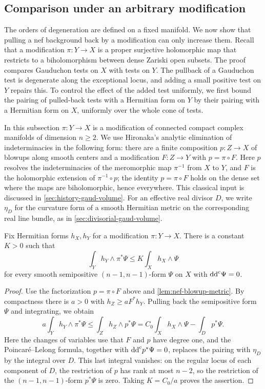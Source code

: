 \subsection{Comparison under an arbitrary modification}\label{sec:nef-modification-comparison}

The orders of degeneration are defined on a fixed manifold. We now show that pulling a nef background back by a modification can only increase them. Recall that a modification $\pi\colon Y\to X$ is a proper surjective holomorphic map that restricts to a biholomorphism between dense Zariski open subsets. The proof compares Gauduchon tests on $X$ with tests on $Y$. The pullback of a Gauduchon test is degenerate along the exceptional locus, and adding a small positive test on $Y$ repairs this. To control the effect of the added test uniformly, we first bound the pairing of pulled-back tests with a Hermitian form on $Y$ by their pairing with a Hermitian form on $X$, uniformly over the whole cone of tests.

In this subsection $\pi\colon Y\to X$ is a modification of connected compact complex manifolds of dimension $n\geq2$. We use Hironaka's analytic elimination of indeterminacies in the following form: there are a finite composition $p\colon Z\to X$ of blowups along smooth centers and a modification $F\colon Z\to Y$ with $p=\pi\circ F$. Here $p$ resolves the indeterminacies of the meromorphic map $\pi^{-1}$ from $X$ to $Y$, and $F$ is the holomorphic extension of $\pi^{-1}\circ p$; the identity $p=\pi\circ F$ holds on the dense set where the maps are biholomorphic, hence everywhere. This classical input is discussed in \cref{sec:history-gaud-volume}. For an effective real divisor $D$, we write $\eta_D$ for the curvature form of a smooth Hermitian metric on the corresponding real line bundle, as in \cref{sec:divisorial-gaud-volume}.

\begin{lemma}\label{lem:nef-uniform-pairing}
Fix Hermitian forms $h_X,h_Y$ for a modification $\pi\colon Y\to X$. There is a constant $K>0$ such that
\begin{equation}\label{eq:nef-uniform-pairing}
 \int_Y h_Y\wedge\pi^*\Psi\leq K\int_X h_X\wedge\Psi
\end{equation}
for every smooth semipositive $(n-1,n-1)$-form $\Psi$ on $X$ with $\mathrm{dd}^{\mathrm{c}}\Psi=0$.
\end{lemma}

\begin{proof}
Use the factorization $p=\pi\circ F$ above and \cref{lem:nef-blowup-metric}. By compactness there is $a>0$ with $h_Z\geq aF^*h_Y$. Pulling back the semipositive form $\Psi$ and integrating, we obtain
\[
 a\int_Yh_Y\wedge\pi^*\Psi
 \leq\int_Zh_Z\wedge p^*\Psi
 =C_0\int_Xh_X\wedge\Psi-\int_Dp^*\Psi.
\]
Here the changes of variables use that $F$ and $p$ have degree one, and the Poincar\'e--Lelong formula, together with $\mathrm{dd}^{\mathrm{c}} p^*\Psi=0$, replaces the pairing with $\eta_D$ by the integral over $D$. This last integral vanishes: on the regular locus of each component of $D$, the restriction of $p$ has rank at most $n-2$, so the restriction of the $(n-1,n-1)$-form $p^*\Psi$ is zero. Taking $K=C_0/a$ proves the assertion.
\end{proof}

